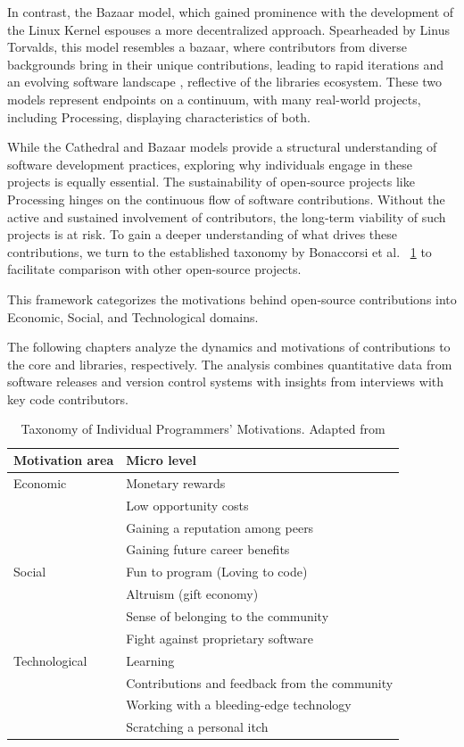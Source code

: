 In contrast, the Bazaar model, which gained prominence with the 
development of the Linux Kernel espouses a more decentralized approach. Spearheaded by Linus Torvalds, this model resembles a bazaar, where contributors from diverse backgrounds bring in their unique contributions, leading to rapid iterations and an evolving software landscape \parencite{TorvaldsLinuxKernelDevelopment1991}, reflective of the libraries ecosystem. 
These two models represent endpoints on a continuum, with many real-world projects, including Processing, displaying characteristics of both. 

While the Cathedral and Bazaar models provide a structural understanding of software development practices, exploring why individuals engage in these projects is equally essential. The sustainability of open‐source projects like Processing hinges on the continuous flow of software contributions. Without the active and sustained involvement of contributors, the long‐term viability of such projects is at risk. To gain a deeper understanding of what drives these contributions, we turn to the established taxonomy by Bonaccorsi et al. ~\ref{tab:taxonomy} \parencite{bonaccorsiComparingMotivationsIndividual2006} to facilitate comparison with other open-source projects.

This framework categorizes the motivations behind open‐source
contributions into Economic, Social, and Technological domains.

The following chapters analyze the dynamics and motivations of contributions to the core and libraries, respectively. The analysis combines quantitative data from software releases and version control systems with insights from interviews with key code contributors.

\begin{table}
    \begin{tabularx}{\textwidth}{l l} 
    \toprule
    Motivation area & Micro level \\
    \midrule
    Economic & Monetary rewards \\
     & Low opportunity costs \\
     & Gaining a reputation among peers \\
     & Gaining future career benefits \\
    \midrule
    Social & Fun to program (Loving to code) \\
     & Altruism (gift economy) \\
     & Sense of belonging to the community \\
     & Fight against proprietary software \\
    \midrule
    Technological & Learning \\
     & Contributions and feedback from the community \\
     & Working with a bleeding-edge technology \\
     & Scratching a personal itch \\
    \bottomrule
    \end{tabularx} 
    \label{tab:taxonomy}
    \caption{Taxonomy of Individual Programmers’ Motivations. Adapted from \parencite{bonaccorsiComparingMotivationsIndividual2006}}
\end{table}

